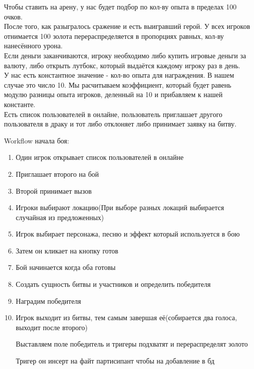 Чтобы ставить на арену, у нас будет подбор по кол-ву опыта в пределах 100 очков.\\
    
После того, как разыгралось сражение и есть выигравший герой. У всех игроков отнимается 100 золота перераспределяется в пропорциях равных, кол-ву нанесённого урона. \\

Если деньги заканчиваются, игроку необходимо либо купить игровые деньги за валюту, либо открыть лутбокс, который выдаётся каждому игроку раз в день. \\

У нас есть константное значение - кол-во опыта для награждения. В нашем случае это число 10. Мы расчитываем коэффициент, который будет равень модулю разницы опыта игроков, деленный на 10 и прибавляем к нашей константе.\\

Есть список пользователей в онлайне, пользователь приглашает другого пользователя в драку и тот либо отклоняет либо принимает заявку на битву.

Workflow начала боя:
\begin{enumerate}
    \item Один игрок открывает список пользователей в онлайне
    \item Приглашает второго на бой
    \item Второй принимает вызов
    \item Игроки выбирают локацию(При выборе разных локаций выбирается случайная из предложенных)
    \item Игрок выбирает персонажа, песню и эффект который используется в бою
    \item Затем он кликает на кнопку готов
    \item Бой начинается когда оба готовы
    
    \item Создать сущность битвы и участников и определить победителя
    
    \item Наградим победителя
    
    \item Игрок выходит из битвы, тем самым завершая её(собирается два голоса, выходит после второго)

    Выставляем поле победитель и тригеры подхватят и перераспределят золото

    Тригер он инсерт на файт партисипант чтобы на добавление в бд 
\end{enumerate}



